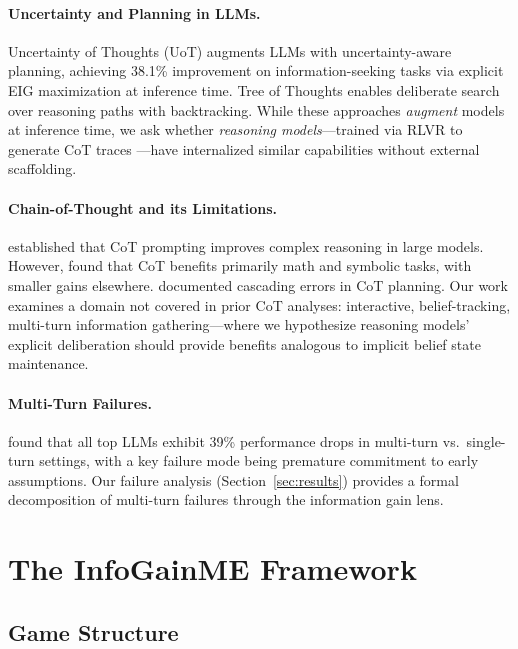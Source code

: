 \documentclass[11pt]{article}
\begin{document}
\paragraph{Uncertainty and Planning in LLMs.}
Uncertainty of Thoughts (UoT) \citep{hu2024uncertainty} augments LLMs with uncertainty-aware planning, achieving 38.1\% improvement on information-seeking tasks via explicit EIG maximization at inference time. Tree of Thoughts \citep{yao2023tot} enables deliberate search over reasoning paths with backtracking. While these approaches \emph{augment} models at inference time, we ask whether \emph{reasoning models}---trained via RLVR to generate CoT traces \citep{deepseek2025r1,openai2024o1,qwen2025qwen3}---have internalized similar capabilities without external scaffolding.

\paragraph{Chain-of-Thought and its Limitations.}
\citet{wei2022chain} established that CoT prompting improves complex reasoning in large models. However, \citet{sprague2024cot} found that CoT benefits primarily math and symbolic tasks, with smaller gains elsewhere. \citet{stechly2024thoughtlessness} documented cascading errors in CoT planning. Our work examines a domain not covered in prior CoT analyses: interactive, belief-tracking, multi-turn information gathering---where we hypothesize reasoning models' explicit deliberation should provide benefits analogous to implicit belief state maintenance.

\paragraph{Multi-Turn Failures.}
\citet{laban2025lost} found that all top LLMs exhibit 39\% performance drops in multi-turn vs.\ single-turn settings, with a key failure mode being premature commitment to early assumptions. Our failure analysis (Section~\ref{sec:results}) provides a formal decomposition of multi-turn failures through the information gain lens.

\section{The InfoGainME Framework}
\label{sec:framework}

\subsection{Game Structure}
\end{document}
